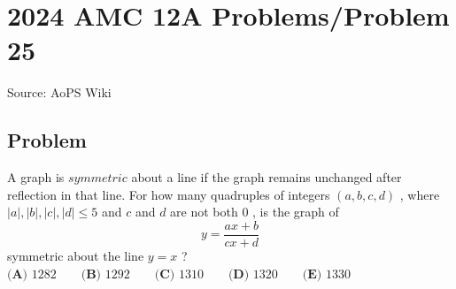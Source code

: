 \documentclass[12pt]{article}
\begin{document}
\section*{{2024 AMC 12A Problems/Problem 25}}
Source: AoPS Wiki

\subsection*{Problem}
A graph is $\textit{symmetric}$ about a line if the graph remains unchanged after reflection in that line. For how many quadruples of integers $(a,b,c,d)$ , where $|a|,|b|,|c|,|d|\le5$ and $c$ and $d$ are not both $0$ , is the graph of \[y=\frac{ax+b}{cx+d}\] symmetric about the line $y=x$ ? $\textbf{(A) }1282\qquad\textbf{(B) }1292\qquad\textbf{(C) }1310\qquad\textbf{(D) }1320\qquad\textbf{(E) }1330$
\end{document}
